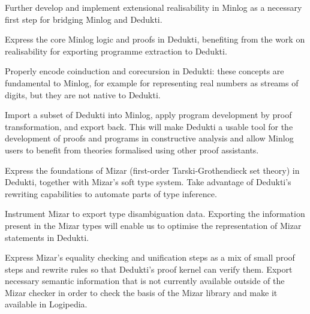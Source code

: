 \begin{workpackage}
\begin{tasklist}
\begin{task}[id=minlog,
  title=Express the theory of Minlog in Dedukti,
  shorttitle=Minlog,
  lead=Lmu,
  LmuRM=16, %
  wphases=1-30,
  ]
  \vspace{-5mm}
  \begin{compactitem}
  \item Further develop and implement extensional realisability in Minlog as
    a necessary first step for bridging Minlog and Dedukti.
  \item Express the core Minlog logic and proofs in Dedukti, benefiting from
    the work on realisability for exporting programme extraction to Dedukti.
  \item Properly encode coinduction and corecursion in Dedukti: these concepts are
    fundamental to Minlog, for example for representing real numbers as streams of
    digits, but they are not native to Dedukti.
  \item Import a subset of Dedukti into Minlog, apply program development by proof
    transformation, and export back. This will make Dedukti a usable tool for the
    development of proofs and programs in constructive analysis and allow Minlog
    users to benefit from theories formalised using other proof assistants.
  \end{compactitem}
\end{task}

\begin{task}[id=mizar,
  title=Express the theory of Mizar in Dedukti,
  shorttitle=Mizar,
  lead=Bia,   %
  BiaRM=70, %
  InnRM=11,   %
  wphases=1-48,
  ]
  \vspace{-5mm}
  \begin{compactitem}
  \item Express the foundations of Mizar (first-order Tarski-Grothendieck set
    theory) in Dedukti, together with Mizar's soft
    type system. Take advantage of Dedukti's rewriting capabilities to automate
    parts of type inference.
  \item Instrument Mizar to export type disambiguation data. Exporting the
    information present in the Mizar types will enable us to optimise the
    representation of Mizar statements in Dedukti.
  \item Express Mizar's equality checking and unification steps as a mix of
    small proof steps and rewrite rules so that Dedukti's proof kernel can
    verify them. Export necessary semantic information that is not currently
    available outside of the Mizar checker in order to check the basis of the
    Mizar library and make it available in Logipedia.
  \end{compactitem}
\end{task}


\end{tasklist}
\end{workpackage}
